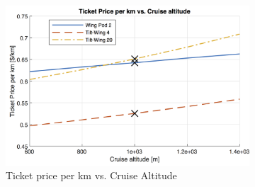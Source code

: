 \begin{figure}[h]
\begin{subfigure}[t]{0.33\textwidth}
    \includegraphics[width=\textwidth]{Figures/Alt_TPrice_perkmNOPAD.png}
    \captionsetup{justification=centering}
    \caption{Ticket price per km vs. Cruise Altitude}
    \label{fig:sens3}
\end{subfigure}
\captionsetup{justification=centering}
\caption{}
\label{fig:sens123}
\end{figure}



